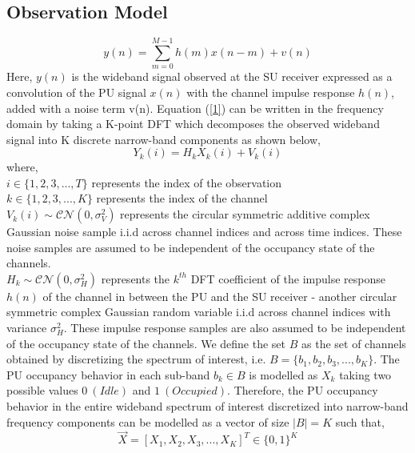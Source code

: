 \documentclass[conference]{IEEEtran}
\begin{document}
\subsection{Observation Model}
\begin{equation}\label{1}
    y(n) = \sum_{m=0}^{M-1} h(m)x(n-m) + v(n)
\end{equation}
Here, $y(n)$ is the wideband signal observed at the SU receiver expressed as a convolution of the PU signal $x(n)$ with the channel impulse response $h(n)$, added with a noise term v(n).
Equation (\ref{1}) can be written in the frequency domain by taking a K-point DFT which decomposes the observed wideband signal into K discrete narrow-band components as shown below,
\begin{equation}\label{2}
    Y_k(i) = H_kX_k(i) + V_k(i)
\end{equation}
where,
\\$i \in \{1,2,3,...,T\}$ represents the index of the observation
\\$k \in \{1,2,3,...,K\}$ represents the index of the channel
\\$V_k(i) \sim \mathcal{CN}(0,\sigma_V^2)$ represents the circular symmetric additive complex Gaussian noise sample i.i.d across channel indices and across time indices. These noise samples are assumed to be independent of the occupancy state of the channels.
\\$H_k \sim \mathcal{CN}(0,\sigma_H^2)$ represents the $k^{th}$ DFT coefficient of the impulse response $h(n)$ of the channel in between the PU and the SU receiver - another circular symmetric complex Gaussian random variable i.i.d across channel indices with variance $\sigma_H^2$. These impulse response samples are also assumed to be independent of the occupancy state of the channels. We define the set $B$ as the set of channels obtained by discretizing the spectrum of interest, i.e. $B=\{b_1,b_2,b_3,...,b_K\}$. The PU occupancy behavior in each sub-band $b_k \in B$ is modelled as $X_k$ taking two possible values $0\ (Idle)$ and $1\ (Occupied)$. Therefore, the PU occupancy behavior in the entire wideband spectrum of interest discretized into narrow-band frequency components can be modelled as a vector of size $|B|=K$ such that,
\begin{equation}\label{3}
    \vec{X} = [X_1,X_2,X_3,...,X_K]^T \in \{0,1\}^K
\end{equation}
\end{document}
